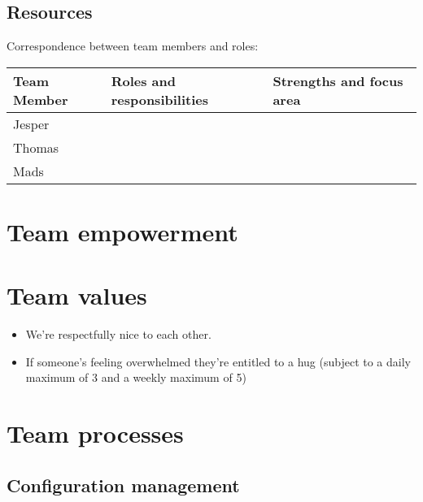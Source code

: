 \documentclass[a4paper,11pt]{article}
\begin{document}
\subsection{Resources} %
\label{subsec:resources}
Correspondence between team members and roles:

\begin{tabular}{|p{3cm}|p{5cm}|p{5cm}|}
\hline
\textbf{Team Member}              & \textbf{Roles and responsibilities}   & \textbf{Strengths and focus area} \\\hline
Jesper                   &                              &                          \\\hline
Thomas                   &                              &                          \\\hline
Mads                     &                              &                          \\\hline 
\end{tabular}


\section{Team empowerment} %
\label{sec:team_empowerment}



\section{Team values} %
\label{sec:team_values}

\begin{itemize}
  \item We're respectfully nice to each other.
  \item If someone's feeling overwhelmed they're entitled to a hug (subject to a daily maximum of 3 and a weekly maximum of 5)
\end{itemize}


\section{Team processes} %
\label{sec:team_processes}

\subsection{Configuration management} %
\label{subsec:configuration_management}
\end{document}
